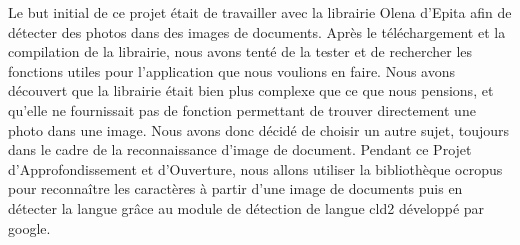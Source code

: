 Le but initial de ce projet était de travailler avec la librairie Olena d'Epita afin de détecter des photos dans des images de documents. Après le téléchargement et la compilation de la librairie, nous avons tenté de la tester et de rechercher les fonctions utiles pour l'application que nous voulions en faire. Nous avons découvert que la librairie était bien plus complexe que ce que nous pensions, et qu'elle ne fournissait pas de fonction permettant de trouver directement une photo dans une image. Nous avons donc décidé de choisir un autre sujet, toujours dans le cadre de la reconnaissance d'image de document. Pendant ce Projet d'Approfondissement et d'Ouverture, nous allons utiliser la bibliothèque ocropus pour reconnaître les caractères à partir d'une image de documents puis en détecter la langue grâce au module de détection de langue cld2 développé par google.